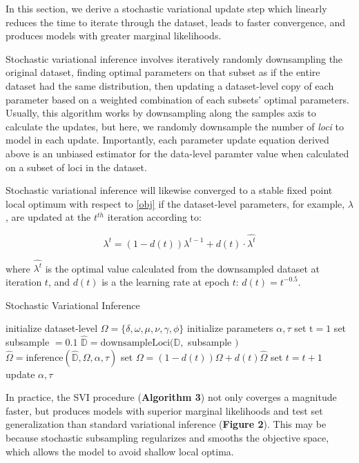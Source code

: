 \documentclass{article}
\begin{document}
In this section, we derive a stochastic variational update step which linearly reduces the time to iterate through the dataset, leads to faster convergence, and produces models with greater marginal likelihoods.

Stochastic variational inference involves iteratively randomly downsampling the original dataset, finding optimal parameters on that subset as if the entire dataset had the same distribution, then updating a dataset-level copy of each parameter based on a weighted combination of each subsets' optimal parameters. Usually, this algorithm works by downsampling along the samples axis to calculate the updates, but here, we randomly downsample the number of \emph{loci} to model in each update. Importantly, each parameter update equation derived above is an unbiased estimator for the data-level paramter value when calculated on a subset of loci in the dataset. 

Stochastic variational inference will likewise converged to a stable fixed point local optimum with respect to \eqref{obj} if the dataset-level parameters, for example, $\lambda$, are updated at the $t^{th}$ iteration according to: 

\begin{equation}
\lambda^t = (1-d(t))\lambda^{t-1} + d(t)\cdot\hat{\lambda^t}
\end{equation}

where $\hat{\lambda^t}$ is the optimal value calculated from the downsampled dataset at iteration $t$, and $d(t)$ is a the learning rate at epoch $t$: $d(t) = t^{-0.5}$. 

\begin{algorithm}
\caption{Stochastic Variational Inference}
\begin{algorithmic}
  \scriptsize
  \STATE initialize dataset-level $\Omega = \{\delta, \omega, \mu, \nu, \gamma, \phi\}$
  \STATE initialize parameters $\alpha, \tau$
  \STATE set $\textrm{t}=1$
  \STATE set subsample $=0.1$
  	\STATE $\hat{\mathbb{D}} = \textrm{downsampleLoci}(\mathbb{D}, $ subsample $)$
  	\STATE $\hat{\Omega} = \textrm{inference}(\hat{\mathbb{D}}, \Omega, \alpha, \tau)$ 
  	\STATE set $\Omega = (1-d(t))\Omega + d(t)\hat{\Omega}$
  	\STATE set $t=t+1$
  		\STATE update $\alpha, \tau$
  	\ENDIF
  \ENDWHILE
\end{algorithmic}
\end{algorithm}

In practice, the SVI procedure (\textbf{Algorithm 3}) not only coverges a magnitude faster, but produces models with superior marginal likelihoods and test set generalization than standard variational inference (\textbf{Figure 2}). This may be because stochastic subsampling regularizes and smooths the objective space, which allows the model to avoid shallow local optima.
\end{document}
